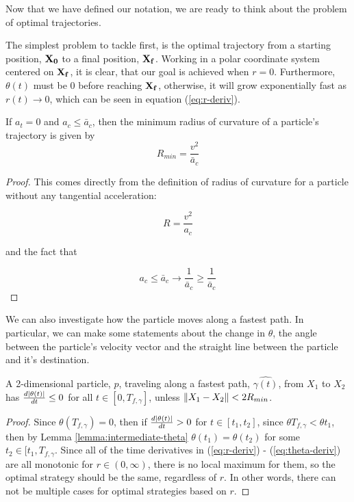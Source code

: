 Now that we have defined our notation, we are ready to think about the problem of optimal trajectories.

The simplest problem to tackle first, is the optimal trajectory from a starting position, $\mathbf{X_0}$ to a final position, $\mathbf{X_f}$. Working in a polar coordinate system centered on $\mathbf{X_f}$, it is clear, that our goal is achieved when $r = 0$. Furthermore, $\theta(t)$ must be $0$ before reaching $\mathbf{X_f}$, otherwise, it will grow exponentially fast as $r(t) \to 0$, which can be seen in equation (\ref{eq:r-deriv}).

\begin{lemma}
  If $a_t=0$ and $a_c \le \bar{a}_{c}$, then the minimum radius of curvature of a particle's trajectory is given by
\begin{equation}
  R_{min} = \frac{v^2}{\bar{a}_{c}}
\end{equation}
\end{lemma}

\begin{proof}
This comes directly from the definition of radius of curvature for a particle without any tangential acceleration:

\[
  R = \frac{v^2}{a_c}
\]

and the fact that 

\[
  a_c \le \bar{a}_{c} \to \frac{1}{\bar{a}_c} \ge \frac{1}{\bar{a}_{c}}
\]
\end{proof}

We can also investigate how the particle moves along a fastest path. In particular, we can make some statements about the change in $\theta$, the angle between the particle's velocity vector and the straight line between the particle and it's destination.

\begin{theorem}
A 2-dimensional particle, $p$, traveling along a fastest path, $\hat{\gamma(t)}$, from $X_1$ to $X_2$ has $\frac{d\abs{\theta(t)}}{dt} \leq 0$ for all $t \in [0, T_{f, \gamma}]$, unless $\norm{X_1 - X_2} < 2 R_{min}$.
\end{theorem}

\begin{proof}
Since $\theta(T_{f,\gamma}) = 0$, then if $\frac{d\abs{\theta(t)}}{dt} > 0$ for $t \in [t_1, t_2]$, since $\theta{T_{f,\gamma}} < \theta{t_1}$, then by Lemma \ref{lemma:intermediate-theta} $\theta(t_1) = \theta(t_2)$ for some $t_2 \in [t_1, T_{f, \gamma}$. Since all of the time derivatives in (\ref{eq:r-deriv}) - (\ref{eq:theta-deriv}) are all monotonic for $r \in (0, \infty)$, there is no local maximum for them, so the optimal strategy should be the same, regardless of $r$. In other words, there can not be multiple cases for optimal strategies based on $r$.
\end{proof}

